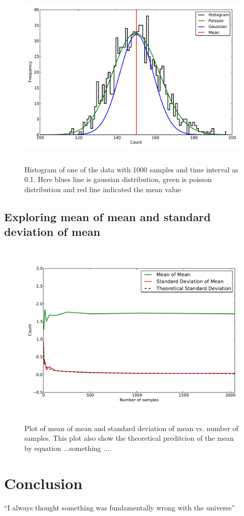 \documentclass[a4paper,12pt]{article}
\begin{document}
\begin{figure}[H]
\centering
\includegraphics[angle=0,height=9cm,width=15.5cm]{graphs/Hist_distribution_big.pdf}
\caption{Histogram of one of the data with 1000 samples and time interval as 0.1. Here blues line is gaussian distribution, green is poisson distribution and red line indicated the mean value}
\label{fig:dark_hist}
\end{figure}


\subsection{Exploring mean of mean and standard deviation of mean}
\label{sec:MOM_SDOM}
\begin{figure}[H]
\centering
\includegraphics[angle=0,height=9cm,width=15.5cm]{graphs/task9.pdf}
\caption{Plot of mean of mean and standard deviation of mean vs. number of samples. This plot also show the theoretical preditcion of the mean by equation ...something ....}
\label{fig:task9}
\end{figure}



\section{Conclusion}
``I always thought something was fundamentally wrong with the universe'' \citep{adams1995hitchhiker}



\end{document}
